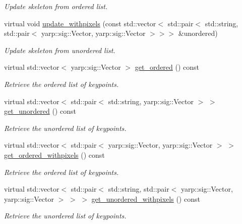 \begin{DoxyCompactItemize}
\begin{DoxyCompactList}\small\item\em Update skeleton from ordered list. \end{DoxyCompactList}\item 
virtual void \mbox{\hyperlink{classassistive__rehab_1_1Skeleton_a36e9dfd4910120025e40ccc3d03c0e01}{update\+\_\+withpixels}} (const std\+::vector$<$ std\+::pair$<$ std\+::string, std\+::pair$<$ yarp\+::sig\+::\+Vector, yarp\+::sig\+::\+Vector $>$$>$$>$ \&unordered)
\begin{DoxyCompactList}\small\item\em Update skeleton from unordered list. \end{DoxyCompactList}\item 
virtual std\+::vector$<$ yarp\+::sig\+::\+Vector $>$ \mbox{\hyperlink{classassistive__rehab_1_1Skeleton_a9c56f7f9e243ae2c4c3fef6dbb051dc2}{get\+\_\+ordered}} () const
\begin{DoxyCompactList}\small\item\em Retrieve the ordered list of keypoints. \end{DoxyCompactList}\item 
virtual std\+::vector$<$ std\+::pair$<$ std\+::string, yarp\+::sig\+::\+Vector $>$ $>$ \mbox{\hyperlink{classassistive__rehab_1_1Skeleton_a7b9f01b2b0f5450920335347c5861a2f}{get\+\_\+unordered}} () const
\begin{DoxyCompactList}\small\item\em Retrieve the unordered list of keypoints. \end{DoxyCompactList}\item 
virtual std\+::vector$<$ std\+::pair$<$ yarp\+::sig\+::\+Vector, yarp\+::sig\+::\+Vector $>$ $>$ \mbox{\hyperlink{classassistive__rehab_1_1Skeleton_a270506cde494cb4261c7892edb46ce53}{get\+\_\+ordered\+\_\+withpixels}} () const
\begin{DoxyCompactList}\small\item\em Retrieve the ordered list of keypoints. \end{DoxyCompactList}\item 
virtual std\+::vector$<$ std\+::pair$<$ std\+::string, std\+::pair$<$ yarp\+::sig\+::\+Vector, yarp\+::sig\+::\+Vector $>$ $>$ $>$ \mbox{\hyperlink{classassistive__rehab_1_1Skeleton_a513a3dc56d55a7b10b256378ae63c6c7}{get\+\_\+unordered\+\_\+withpixels}} () const
\begin{DoxyCompactList}\small\item\em Retrieve the unordered list of keypoints. \end{DoxyCompactList}\item 

\end{DoxyCompactItemize}

